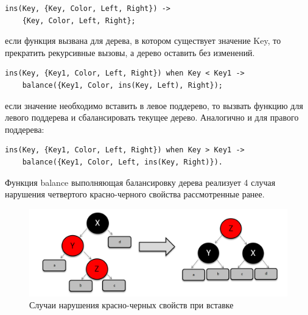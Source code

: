 			\begin{lstlisting}
ins(Key, {Key, Color, Left, Right}) ->
    {Key, Color, Left, Right};
			\end{lstlisting}
			если функция вызвана для дерева, в котором существует значение Key, то 
			прекратить рекурсивные вызовы, а дерево оставить без изменений.
			
			\begin{lstlisting}
ins(Key, {Key1, Color, Left, Right}) when Key < Key1 ->
    balance({Key1, Color, ins(Key, Left), Right});
			\end{lstlisting}
			если значение необходимо вставить в левое поддерево, то вызвать функцию для 
			левого поддерева и сбалансировать текущее дерево. Аналогично и для правого 
			поддерева:
			\begin{lstlisting}
ins(Key, {Key1, Color, Left, Right}) when Key > Key1 ->
    balance({Key1, Color, Left, ins(Key, Right)}).
			\end{lstlisting}
			
			Функция balance выполняющая балансировку дерева реализует 4 случая нарушения 
			четвертого красно-черного свойства рассмотренные ранее.
			\begin{figure}[H]
				\centering
				\includegraphics[width=\textwidth]{img/insert/clause_4.png}
				\caption{Случаи нарушения красно-черных свойств при вставке}
			\end{figure}
			
		

